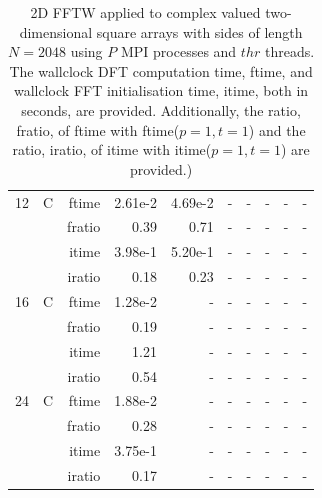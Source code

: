 \documentclass[a4paper]{article}
\begin{document}
\begin{table}[htbp]
\begin{center}
\begin{small}
\begin{tabular}{|r|r|r|r|r|r|r|r|r|r|}
   12 &   C &   ftime &   2.61e-2 &    4.69e-2 &   - &   - &   - &   - &   - \\
           &            &  fratio &   0.39 &    0.71 &   - &   - &   - &   - &   - \\
           &            &  itime &   3.98e-1 &    5.20e-1 &   - &   - &   - &   - &   - \\
           &            &  iratio &   0.18 &    0.23 &   - &   - &   - &   - &   - \\\hline
   16 &   C &   ftime &   1.28e-2 &   - &   - &   - &   - &   - &   - \\
           &            &  fratio &   0.19 &   - &   - &   - &   - &   - &   - \\
           &            &  itime &   1.21  &   - &   - &   - &   - &   - &   - \\
           &            &  iratio &   0.54 &   - &   - &   - &   - &   - &   - \\\hline
   24 &   C &   ftime &   1.88e-2 &   - &   - &   - &   - &   - &   - \\
           &            &  fratio &   0.28 &   - &   - &   - &   - &   - &   - \\
           &            &  itime &   3.75e-1 &   - &   - &   - &   - &   - &   - \\
           &            &  iratio &   0.17 &   - &   - &   - &   - &   - &   - \\\hline
\end{tabular}
\caption{2D FFTW applied to complex valued two-dimensional square arrays with sides of length $N=2048$ using $P$ MPI processes and $thr$ threads. The wallclock DFT computation time, ftime, and wallclock FFT initialisation time, itime, both in seconds, are provided. Additionally, the ratio, fratio, of ftime  with ftime($p=1,t=1$) and the ratio, iratio, of itime  with itime($p=1,t=1$) are provided.) }\label{Tbl:FFTW2d2048c}
\end{small}
\end{center}
\end{table}
\end{document}
